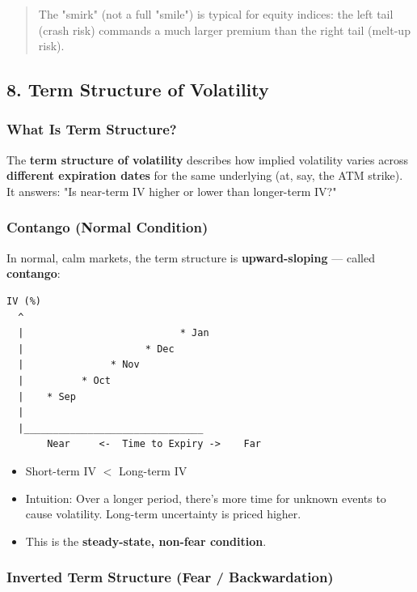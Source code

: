 \documentclass[12pt,openany]{book}
\begin{document}
\begin{quote}
The "smirk" (not a full "smile") is typical for equity indices: the left tail (crash risk) commands a much larger premium than the right tail (melt-up risk).
\end{quote}

\subsection{8. Term Structure of Volatility}

\subsubsection{What Is Term Structure?}

The \textbf{term structure of volatility} describes how implied volatility varies across \textbf{different expiration dates} for the same underlying (at, say, the ATM strike). It answers: "Is near-term IV higher or lower than longer-term IV?"

\subsubsection{Contango (Normal Condition)}

In normal, calm markets, the term structure is \textbf{upward-sloping} — called \textbf{contango}:

\begin{center}
\begin{Verbatim}[fontsize=\small,breaklines=true]
IV (%)
  ^
  |                           * Jan
  |                     * Dec
  |               * Nov
  |          * Oct
  |    * Sep
  |
  |_______________________________
       Near     <-  Time to Expiry ->    Far
\end{Verbatim}
\end{center}

\begin{itemize}[leftmargin=*]
    \item Short-term IV \(<\) Long-term IV
    \item Intuition: Over a longer period, there's more time for unknown events to cause volatility. Long-term uncertainty is priced higher.
    \item This is the \textbf{steady-state, non-fear condition}.
\end{itemize}

\subsubsection{Inverted Term Structure (Fear / Backwardation)}
\end{document}
